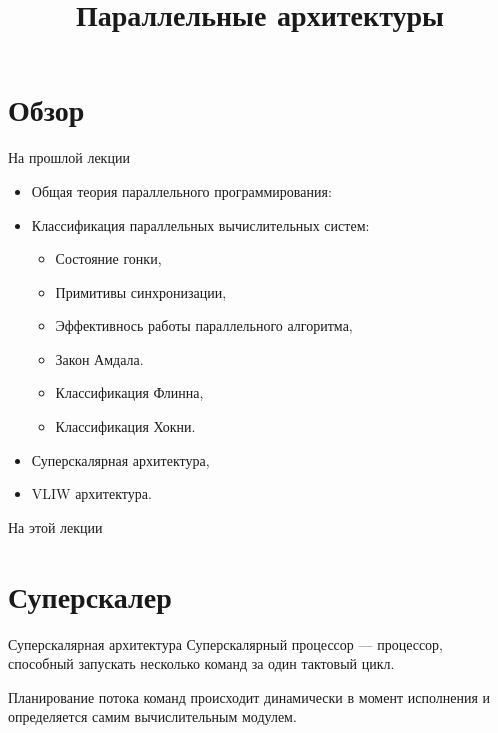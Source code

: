 

\title{Параллельные архитектуры}



\begin{frame}
\titlepage
\end{frame}

\section*{Обзор}

\begin{frame}{На прошлой лекции}
\begin{itemize}
\ifmipt
    \item Общая теория параллельного программирования:
\fi
\ifsbertech
    \item Классификация параллельных вычислительных систем:
\fi
    \begin{itemize}
\ifmipt
        \item Состояние гонки,
        \item Примитивы синхронизации,
        \item Эффективнось работы параллельного алгоритма,
        \item Закон Амдала.
\fi
\ifsbertech
        \item Классификация Флинна,
        \item Классификация Хокни.
\fi
    \end{itemize}
\ifsbertech
    \item Суперскалярная архитектура,
    \item VLIW архитектура.
\fi
\end{itemize}
\end{frame}

\begin{frame}{На этой лекции}
\tableofcontents
\end{frame}

\section{Суперскалер}

\begin{frame}{Суперскалярная архитектура}
Суперскалярный процессор --- процессор, способный запускать несколько команд за
один тактовый цикл.

\vspace*{1cm}\pause
Планирование потока команд происходит динамически в момент исполнения и определяется самим
вычислительным модулем.
\end{frame}

